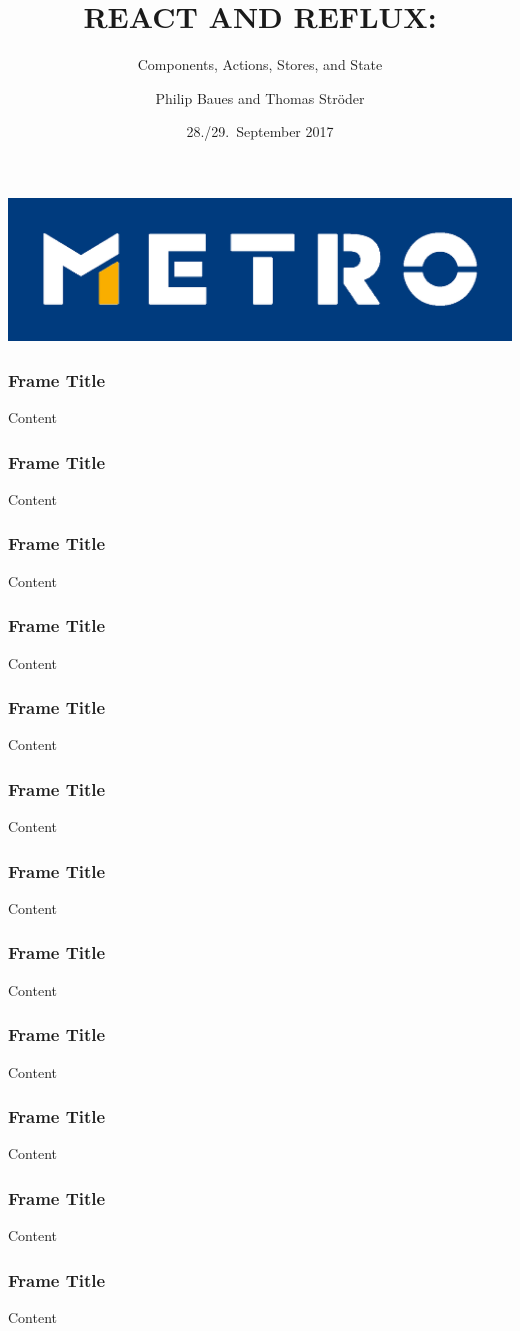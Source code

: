 \documentclass{beamer}
\begin{document}
\title[React and Reflux]{REACT AND REFLUX:}
\subtitle{Components, Actions, Stores, and State}
\author[P.\ Baues, T.\ Str\"oder]{Philip Baues and Thomas Str\"oder}
\date{28./29.\ September 2017}
\newcommand{\location}{\texttt{code.talks} Hamburg}

{
\begin{frame}[plain]
\centering
\includegraphics{metro2.png}
\end{frame}
}

{
\begin{frame}[plain]
\titlepage
\end{frame}
}

\begin{frame}\frametitle{Frame Title}
\centering
Content
\end{frame}

\begin{frame}\frametitle{Frame Title}
\centering
Content
\end{frame}

\begin{frame}\frametitle{Frame Title}
\centering
Content
\end{frame}

\begin{frame}\frametitle{Frame Title}
\centering
Content
\end{frame}

\begin{frame}\frametitle{Frame Title}
\centering
Content
\end{frame}

\begin{frame}\frametitle{Frame Title}
\centering
Content
\end{frame}

\begin{frame}\frametitle{Frame Title}
\centering
Content
\end{frame}

\begin{frame}\frametitle{Frame Title}
\centering
Content
\end{frame}

\begin{frame}\frametitle{Frame Title}
\centering
Content
\end{frame}

\begin{frame}\frametitle{Frame Title}
\centering
Content
\end{frame}

\begin{frame}\frametitle{Frame Title}
\centering
Content
\end{frame}

\begin{frame}\frametitle{Frame Title}
\centering
Content
\end{frame}
\end{document}
